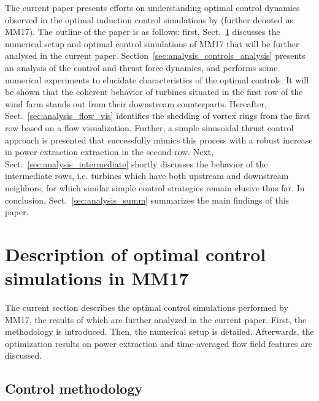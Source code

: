 \documentclass[wes, manuscript]{copernicus}
\begin{document}
The current paper presents efforts on understanding optimal control dynamics observed in the optimal induction control simulations by \cite{munters2017optimal} (further denoted as MM17). The outline of the paper is as follows: first, Sect.~\ref{sec:optimal_control_sims} discusses the numerical setup and optimal control simulations of MM17 that will be further analysed in the current paper. Section~\ref{sec:analysis_controls_analysis} presents an analysis of the control and thrust force dynamics, and performs some numerical experiments to elucidate characteristics of the optimal controls. It will be shown that the coherent behavior of turbines situated in the first row of the wind farm stands out from their downstream counterparts. Hereafter, Sect.~\ref{sec:analysis_flow_vis} identifies the shedding of vortex rings from the first row based on a flow visualization. Further, a simple sinusoidal thrust control approach is presented that successfully mimics this process with a robust increase in power extraction extraction in the second row. Next, Sect.~\ref{sec:analysis_intermediate} shortly discusses the behavior of the intermediate rows, i.e. turbines which have both upstream and downstream neighbors, for which similar simple control strategies remain elusive thus far. In conclusion, Sect.~\ref{sec:analysis_summ} summarizes the main findings of this paper.

\section{Description of optimal control simulations in MM17}\label{sec:optimal_control_sims}
The current section describes the optimal control simulations performed by MM17, the results of which are further analyzed in the current paper. First, the methodology is introduced. Then, the numerical setup is detailed. Afterwards, the optimization results on power extraction and time-averaged flow field features are discussed. 

\subsection{Control methodology}
\end{document}
